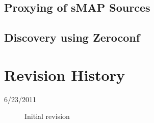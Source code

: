 \documentclass[10pt,letterpaper]{article}
\newcommand{\smap}{sMAP}
\begin{document}
\subsection{Proxying of \smap{} Sources}

\subsection{Discovery using Zeroconf}



\section*{Revision History}
\begin{description}
\item[6/23/2011] Initial revision
\end{description}
\end{document}
